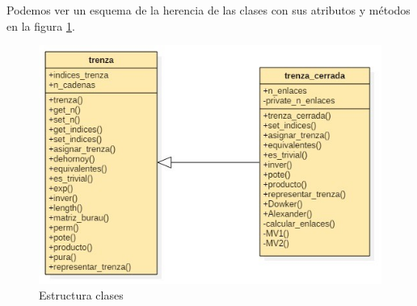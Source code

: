 Podemos ver un esquema de la herencia de las clases con sus atributos y métodos en la figura \ref{escl}.
\newpage
\begin{figure}[h!]
	\centering
	\includegraphics[width=16cm]{img/Main.jpg}
	\caption{Estructura clases}
	\label{escl} 
\end{figure}

